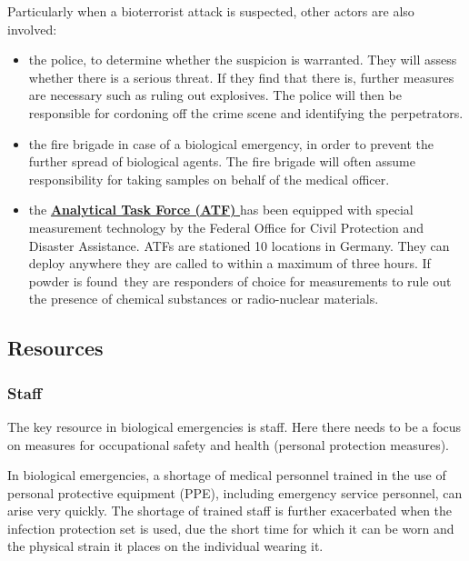 \documentclass{article}
\begin{document}
Particularly when a bioterrorist attack is suspected, other actors are also involved:

\begin{itemize}
\item the police, to determine whether the suspicion is warranted. They will assess whether there is a serious threat. If they find that there is, further measures are necessary such as ruling out explosives. The police will then be responsible for cordoning off the crime scene and identifying the perpetrators.


\item the fire brigade in case of a biological emergency, in order to prevent the further spread of biological agents. The fire brigade will often assume responsibility for taking samples on behalf of the medical officer.


\item the \textbf{\href{https://www.bbk.bund.de/DE/AufgabenundAusstattung/CBRNSchutz/ATF/ATF_node.html}{Analytical Task Force (ATF)}}\href{https://www.bbk.bund.de/DE/AufgabenundAusstattung/CBRNSchutz/ATF/ATF_node.html}{ }has been equipped with special measurement technology by the Federal Office for Civil Protection and Disaster Assistance. ATFs are stationed 10 locations in Germany. They can deploy anywhere they are called to within a maximum of three hours. If powder is found they are responders of choice for measurements to rule out the presence of chemical substances or radio-nuclear materials.


\end{itemize}

\subsection{Resources}\label{H6936234}



\subsubsection{Staff}\label{H1778697}



The key resource in biological emergencies is staff. Here there needs to be a focus on measures for occupational safety and health (personal protection measures).


In biological emergencies, a shortage of medical personnel trained in the use of personal protective equipment (PPE), including emergency service personnel, can arise very quickly. The shortage of trained staff is further exacerbated when the infection protection set is used, due the short time for which it can be worn and the physical strain it places on the individual wearing it.
\end{document}
